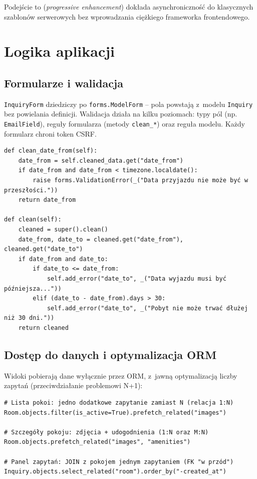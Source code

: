 \documentclass[12pt,a4paper]{article}
\begin{document}
Podejście to (\emph{progressive enhancement}) dokłada asynchroniczność do klasycznych
szablonów serwerowych bez wprowadzania ciężkiego frameworka frontendowego.

\section{Logika aplikacji}
\label{sec:backend}

\subsection{Formularze i walidacja}

\texttt{InquiryForm} dziedziczy po \texttt{forms.ModelForm} -- pola powstają
z~modelu \texttt{Inquiry} bez powielania definicji. Walidacja działa na kilku
poziomach: typy pól (np. \texttt{EmailField}), reguły formularza (metody
\texttt{clean\_*}) oraz reguła modelu. Każdy formularz chroni token CSRF.

\begin{lstlisting}[style=pythonstyle, caption={Walidacja wielopoziomowa (forms.py)}]
def clean_date_from(self):
    date_from = self.cleaned_data.get("date_from")
    if date_from and date_from < timezone.localdate():
        raise forms.ValidationError(_("Data przyjazdu nie może być w przeszłości."))
    return date_from

def clean(self):
    cleaned = super().clean()
    date_from, date_to = cleaned.get("date_from"), cleaned.get("date_to")
    if date_from and date_to:
        if date_to <= date_from:
            self.add_error("date_to", _("Data wyjazdu musi być późniejsza..."))
        elif (date_to - date_from).days > 30:
            self.add_error("date_to", _("Pobyt nie może trwać dłużej niż 30 dni."))
    return cleaned
\end{lstlisting}

\subsection{Dostęp do danych i optymalizacja ORM}
\label{sec:orm}

Widoki pobierają dane wyłącznie przez ORM, z~jawną optymalizacją liczby zapytań
(przeciwdziałanie problemowi N+1):

\begin{lstlisting}[style=pythonstyle, caption={Optymalizacja zapytań (views/rooms.py, views/inquiries.py)}]
# Lista pokoi: jedno dodatkowe zapytanie zamiast N (relacja 1:N)
Room.objects.filter(is_active=True).prefetch_related("images")

# Szczegóły pokoju: zdjęcia + udogodnienia (1:N oraz M:N)
Room.objects.prefetch_related("images", "amenities")

# Panel zapytań: JOIN z pokojem jednym zapytaniem (FK "w przód")
Inquiry.objects.select_related("room").order_by("-created_at")
\end{lstlisting}
\end{document}
